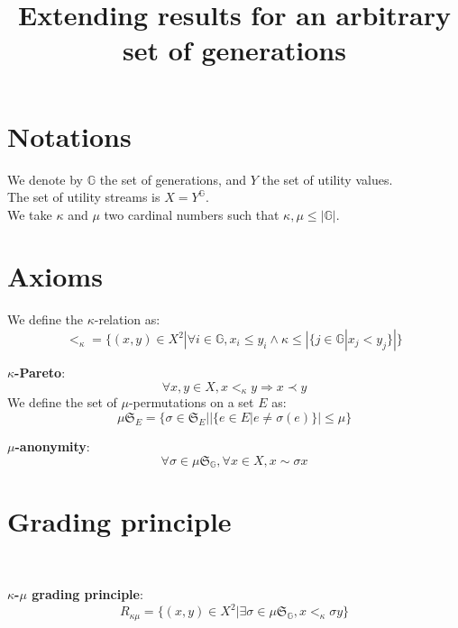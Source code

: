 \documentclass{article}
\title{Extending results for an arbitrary set of generations}
\author{}
\newcommand{\G}{\mathbb{G}}
\begin{document}
\maketitle

\section{Notations}

We denote by $\G$ the set of generations, and $Y$ the set of utility values.\\
The set of utility streams is $X=Y^\G$.\\
We take $\kappa$ and $\mu$ two cardinal numbers such that $\kappa,\mu\leq|\G|$.

\section{Axioms}

We define the $\kappa$-relation as:
\[<_\kappa = \{(x,y)\in X^2|\forall i\in \G, x_i \leq y_i \land \kappa \leq
|\{j \in \G | x_j < y_j\}|\}\]

\textbf{$\kappa$-Pareto}:
\[\forall x,y\in X, x <_\kappa y \Rightarrow x \prec y\]
We define the set of $\mu$-permutations on a set $E$ as:
\[\mu\mathfrak{S}_E = \{\sigma\in\mathfrak{S}_E | |\{e\in E|e\neq \sigma(e)\}|\leq \mu\}\]

\textbf{$\mu$-anonymity}:
\[\forall\sigma\in\mu\mathfrak{S}_\G,\forall x\in X, x \sim \sigma x\]

\section{Grading principle}
\ \par
\textbf{$\kappa$-$\mu$ grading principle}:
\[R_{\kappa\mu} = \{(x,y)\in X^2 | \exists\sigma\in\mu\mathfrak{S}_\G, x <_\kappa \sigma y\}\]



\end{document}
